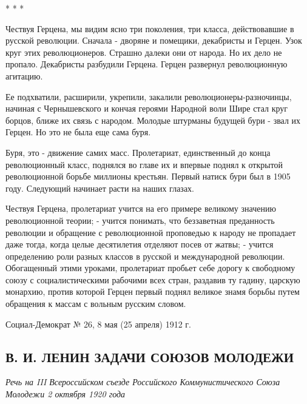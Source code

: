 \documentclass[12pt]{article}
\newcommand{\parnum}{(\arabic{parcount})}
\newcounter{parcount}
\newenvironment{parnumbers}{%
  \par%
  \everypar{\noindent \stepcounter{parcount}\marginpar[]{\parnum}}%
}{}
\begin{document}
* * *

\begin{parnumbers}
Чествуя Герцена, мы видим ясно три поколения, три класса, действовавшие в русской революции. Сначала - дворяне и помещики, декабристы и Герцен. Узок круг этих революционеров. Страшно далеки они от народа. Но их дело не пропало. Декабристы разбудили Герцена. Герцен развернул революционную агитацию.

Ее подхватили, расширили, укрепили, закалили революционеры-разночинцы, начиная с Чернышевского и кончая героями Народной воли Шире стал круг борцов, ближе их связь с народом. Молодые штурманы будущей бури - звал их Герцен. Но это не была еще сама буря.

Буря, это - движение самих масс. Пролетариат, единственный до конца революционный класс, поднялся во главе их и впервые поднял к открытой революционной борьбе миллионы крестьян. Первый натиск бури был в 1905 году. Следующий начинает расти на наших глазах.

Чествуя Герцена, пролетариат учится на его примере великому значению революционной теории; - учится понимать, что беззаветная преданность революции и обращение с революционной проповедью к народу не пропадает даже тогда, когда целые десятилетия отделяют посев от жатвы; - учится определению роли разных классов в русской и международной революции. Обогащенный этими уроками, пролетариат пробьет себе дорогу к свободному союзу с социалистическими рабочими всех стран, раздавив ту гадину, царскую монархию, против которой Герцен первый поднял великое знамя борьбы путем обращения к массам с вольным русским словом.
\end{parnumbers}

Социал-Демократ № 26, 8 мая (25 апреля) 1912 г.

\subsection{В. И. ЛЕНИН ЗАДАЧИ СОЮЗОВ МОЛОДЕЖИ}
\textit{Речь на III Всероссийском съезде Российского Коммунистического Союза Молодежи 2 октября 1920 года}
\end{document}

